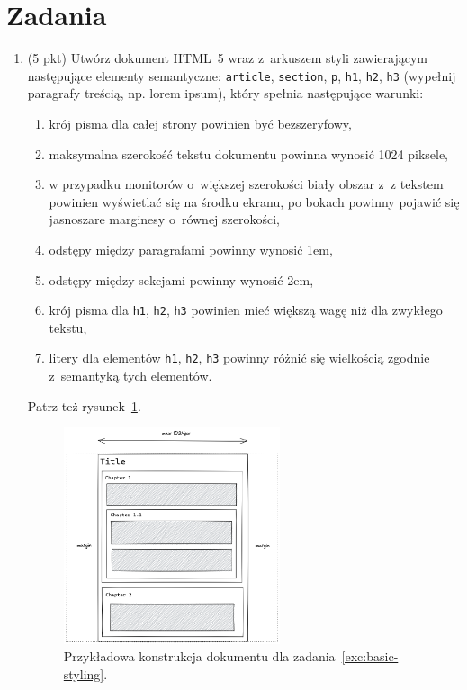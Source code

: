 \documentclass[12pt]{article}
\begin{document}
    \section*{Zadania}
    \begin{enumerate}
        \item\label{exc:basic-styling}
            (5 pkt) Utwórz dokument HTML~5 wraz z~arkuszem styli zawierającym następujące elementy semantyczne: \texttt{article}, \texttt{section}, \texttt{p}, \texttt{h1}, \texttt{h2}, \texttt{h3} (wypełnij paragrafy treścią, np. lorem ipsum), który spełnia następujące warunki:
            \begin{enumerate}
                \item krój pisma dla całej strony powinien być bezszeryfowy,
                \item maksymalna szerokość tekstu dokumentu powinna wynosić 1024 piksele,
                \item w przypadku monitorów o~większej szerokości biały obszar z~z tekstem powinien wyświetlać się na środku ekranu, po bokach powinny pojawić się jasnoszare marginesy o~równej szerokości,
                \item odstępy między paragrafami powinny wynosić 1em,
                \item odstępy między sekcjami powinny wynosić 2em,
                \item krój pisma dla \texttt{h1}, \texttt{h2}, \texttt{h3} powinien mieć większą wagę niż dla zwykłego tekstu,
                \item litery dla elementów \texttt{h1}, \texttt{h2}, \texttt{h3} powinny różnić się wielkością zgodnie z~semantyką tych elementów.
            \end{enumerate}
            Patrz też rysunek~\ref{fig:basic-styling}.

            \begin{figure}[p]
                \centering
                \includegraphics[width=0.6\textwidth]{zad1}
                \caption{Przykładowa konstrukcja dokumentu dla zadania~\ref{exc:basic-styling}.}
                \label{fig:basic-styling}
            \end{figure}


\end{enumerate}
\end{document}

